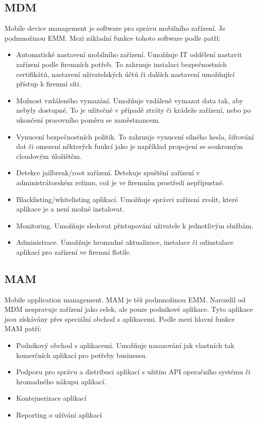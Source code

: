  
 
  \subsection{MDM}
 Mobile device management je software pro správu mobilního zařízení. Je podmnožinou EMM. Mezi základní funkce tohoto software podle \cite{systemOnline} patří:
 \begin{itemize}
     \item Automatické nastavení mobilního zařízení. Umožňuje IT oddělení nastavit zařízení podle firemních potřeb. To zahrnuje instalaci bezpečnostních certifikátů, nastavení uživatelských účtů či dalších nastavení umožňující přístup k firemní síti.
     \item Možnost vzdáleného vymazání. Umožňuje vzdáleně vymazat data tak, aby nebyly dostupné. To je užitečné v případě ztráty či krádeže zařízení, nebo po ukončení pracovního poměru se zaměstnancem.
     \item Vynucení bezpečnostních politik. To zahrnuje vynucení silného hesla, šifrování dat či omezení některých funkcí jako je například propojení se soukromým cloudovým úložištěm. 
     \item Detekce jailbreak/root zařízení. Detekuje spuštění zařízení v administrátorském režimu, což je ve firemním prostředí nepřípustné.
     \item Blacklisting/whitelisting aplikací. Umožňuje správci zařízení zvolit, které aplikace je a není možné instalovat.
     \item Monitoring. Umožňuje sledovat přistupování uživatele k jednotlivým službám.
     \item Administrace. Umožňuje hromadné aktualizace, instalace či odinstalace aplikací pro zařízení ve firemní flotile.
 \end{itemize}
 
 
 \subsection{MAM} 
 Mobile application management. MAM je též podmnožinou EMM. Narozdíl od MDM nespravuje zařízení jako celek, ale pouze podnikové aplikace. Tyto aplikace jsou získávány přes speciální obchod s aplikacemi. Podle \cite{MAMcitace} mezi hlavní funkce MAM patří:
 \begin{itemize}
     \item Podnikový obchod s aplikacemi. Umožňuje nasazování jak vlastních tak komerčních aplikací pro potřeby businessu.
     \item Podporu pro správu a distribuci aplikací s užitím API operačního systému či hromadného nákupu aplikací.
     \item Kontejnerizace aplikací
     \item Reporting o užívání aplikací
 \end{itemize}
 
